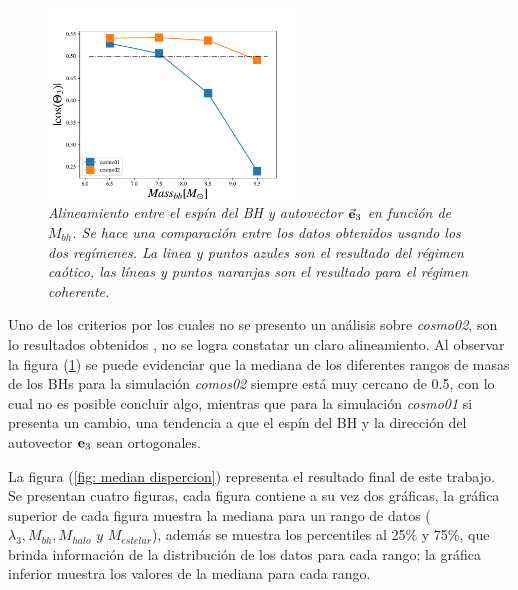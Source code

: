 \begin{figure}
    \centering
    \includegraphics[width=0.6\textwidth]{./figures/6_Resultados/cosmo01/relacion_simulaciones_Mass_bh.pdf}
    \caption{\emph{Alineamiento entre el espín del BH y autovector $\vec{\bf{e}}_3$ en función de $M_{bh}$. Se hace una comparación entre los datos obtenidos usando los dos regímenes. La linea y puntos azules son el resultado del régimen caótico, las líneas y puntos naranjas son el resultado para el régimen coherente.}}
    \label{fig: comparacion cosmo01 y cosmo02}
\end{figure}
 
Uno de los criterios por los cuales no se presento un análisis sobre {\it{cosmo02}}, son lo resultados obtenidos 
, no se logra constatar un claro  alineamiento. Al observar la figura (\ref{fig: comparacion cosmo01 y cosmo02}) se puede evidenciar que la mediana de los diferentes rangos de masas de los BHs para la simulación {\it{comos02}} siempre está muy cercano de 0.5, con lo cual no es posible concluir algo, mientras que para la simulación {\it{cosmo01}} si presenta un cambio, una tendencia a que el espín del BH y la dirección del autovector ${\bf{e}}_{3}$ sean ortogonales. 

La figura (\ref{fig: median dispercion}) representa el resultado final de este trabajo. Se presentan cuatro  figuras, cada figura contiene a su vez dos gráficas, la gráfica superior de cada figura muestra la mediana para un rango de datos ($\lambda_{3}, M_{bh}, M_{halo}\,\, y\,\, M_{estelar}$), además se muestra los percentiles al 25$\%$ y 75$\%$, que brinda información de la distribución de los datos para cada rango; la gráfica inferior muestra los valores de la  mediana para cada rango.

